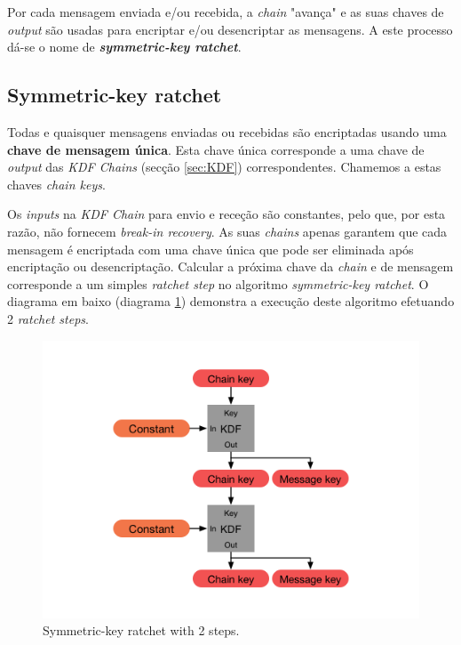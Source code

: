 Por cada mensagem enviada e/ou recebida, a \emph{chain} "avança" e as suas chaves de \emph{output} são usadas para encriptar e/ou desencriptar as mensagens. A este processo dá-se o nome de \textbf{\textit{symmetric-key ratchet}}.


\subsection{Symmetric-key ratchet}\label{sec:symkey}

Todas e quaisquer mensagens enviadas ou recebidas são encriptadas usando uma \textbf{chave de mensagem única}. Esta chave única corresponde a uma chave de \textit{output} das \textit{KDF Chains} (secção \ref{sec:KDF}) correspondentes. Chamemos a estas chaves \textit{chain keys}.

Os \textit{inputs} na \textit{KDF Chain} para envio e receção são constantes, pelo que, por esta razão, não fornecem \textit{break-in recovery}. As suas \textit{chains} apenas garantem que cada mensagem é encriptada com uma chave única que pode ser eliminada após encriptação ou desencriptação. Calcular a próxima chave da \textit{chain} e de mensagem corresponde a um simples \textit{ratchet step} no algoritmo \textit{symmetric-key ratchet}.
O diagrama em baixo (diagrama \ref{diagram:skRatchet}) demonstra a execução deste algoritmo efetuando 2 \textit{ratchet steps}.

\begin{figure}[H]
\begin{center}
\includegraphics[width=12cm]{img/skRatchet.png}
\caption{Symmetric-key ratchet with 2 steps.}
\label{diagram:skRatchet}
\centering
\end{center}
\end{figure}

